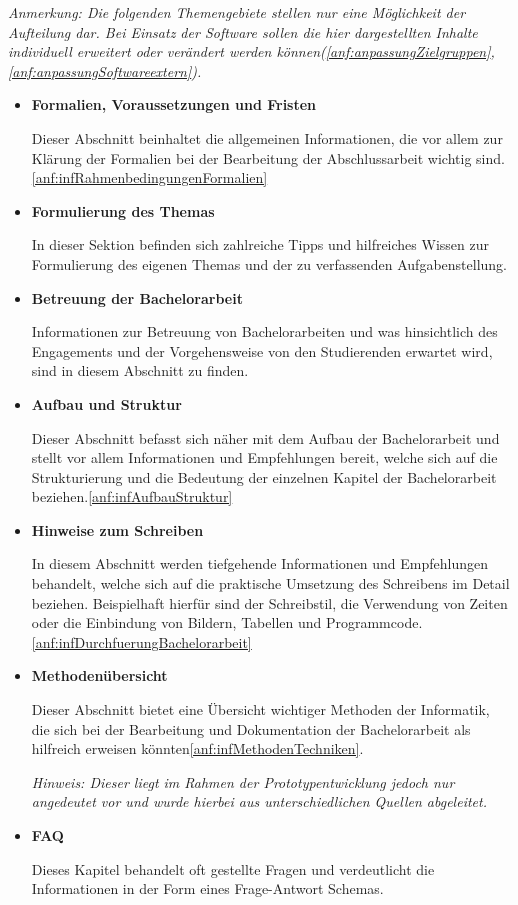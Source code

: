 \documentclass[bibliography=totoc,listof=totoc,BCOR=5mm,DIV=12,oneside]{scrbook}
\begin{document}
\par\bigskip \textit{Anmerkung: Die folgenden Themengebiete stellen nur eine Möglichkeit der Aufteilung dar. Bei Einsatz der Software sollen die hier dargestellten Inhalte individuell erweitert oder verändert werden können(\ref{anf:anpassungZielgruppen}, \ref{anf:anpassungSoftwareextern}).}

\begin{itemize}
\item \textbf{Formalien, Voraussetzungen und Fristen}
\par Dieser Abschnitt beinhaltet die allgemeinen Informationen, die vor allem zur Klärung der Formalien bei der Bearbeitung der Abschlussarbeit wichtig sind.\ref{anf:infRahmenbedingungenFormalien}

\item \textbf{Formulierung des Themas}
\par In dieser Sektion befinden sich zahlreiche Tipps und hilfreiches Wissen zur Formulierung des eigenen Themas und der zu verfassenden Aufgabenstellung.

\item \textbf{Betreuung der Bachelorarbeit}
\par Informationen zur Betreuung von Bachelorarbeiten und was hinsichtlich des Engagements und der Vorgehensweise von den Studierenden erwartet wird, sind in diesem Abschnitt zu finden.

\item \textbf{Aufbau und Struktur}
\par Dieser Abschnitt befasst sich näher mit dem Aufbau der Bachelorarbeit und stellt vor allem Informationen und Empfehlungen bereit, welche sich auf die Strukturierung und die Bedeutung der einzelnen Kapitel der Bachelorarbeit beziehen.\ref{anf:infAufbauStruktur}

\item \textbf{Hinweise zum Schreiben}
\par In diesem Abschnitt werden tiefgehende Informationen und Empfehlungen behandelt, welche sich auf die praktische Umsetzung des Schreibens im Detail beziehen. Beispielhaft hierfür sind der Schreibstil, die Verwendung von Zeiten oder die Einbindung von Bildern, Tabellen und Programmcode.\ref{anf:infDurchfuerungBachelorarbeit}

\item \textbf{Methodenübersicht}
\par Dieser Abschnitt bietet eine Übersicht wichtiger Methoden der Informatik, die sich bei der Bearbeitung und Dokumentation der Bachelorarbeit als hilfreich erweisen könnten\ref{anf:infMethodenTechniken}. 
\par \textit{Hinweis: Dieser liegt im Rahmen der Prototypentwicklung jedoch nur angedeutet vor und wurde hierbei aus unterschiedlichen Quellen abgeleitet. \citep{Anforderungsanalyse} \citep{Balzert2010}
}

\item \textbf{FAQ}
\par Dieses Kapitel behandelt oft gestellte Fragen und verdeutlicht die Informationen in der Form eines Frage-Antwort Schemas.
\end{itemize}
\end{document}
